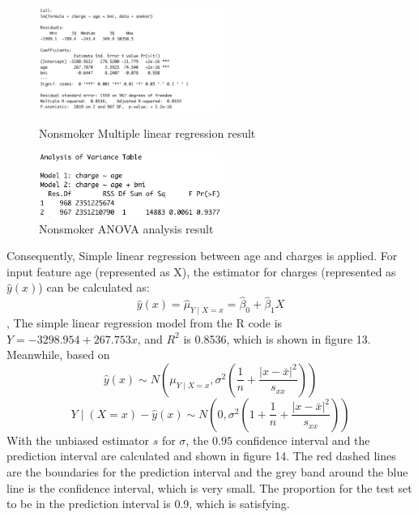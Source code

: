 \documentclass[12pt,a4paper]{article}
\begin{document}
\begin{figure}[H]
\centering
\begin{minipage}[t]{0.48\textwidth}
\centering
\includegraphics[width=6cm]{aftercleanlinear model.png}
\caption{Nonsmoker Multiple linear regression result}
\end{minipage}
\begin{minipage}[t]{0.48\textwidth}
\centering
\includegraphics[width=6cm]{ANOVA.jpg}
\caption{Nonsmoker ANOVA analysis result}
\end{minipage}
\end{figure}

Consequently, Simple linear regression between age and charges is applied.
For input feature age (represented as X), the estimator for charges (represented as $\widehat{y}(x)$) can be calculated as:
$$\widehat{y}(x)=\widehat{\mu}_{Y \mid X=x}=\widehat{\beta}_{0}+\widehat{\beta}_{1} X $$,
The simple linear regression model from the R code is $Y = -3298.954 + 267.753x$, and $R^{2}$ is 0.8536, which is shown in figure 13.
Meanwhile, based on
$$\widehat{y}(x) \sim N\left(\mu_{Y \mid X=x}, \sigma^{2}\left(\frac{1}{n}+\frac{|x-\bar{x}|^{2}}{s_{x x}}\right)\right)$$
$$Y \mid(X=x)-\widehat{y}(x) \sim N\left(0, \sigma^{2}\left(1+\frac{1}{n}+\frac{|x-\bar{x}|^{2}}{s_{x x}}\right)\right)$$
With the unbiased estimator $s$ for $\sigma$, the  $0.95 $ confidence interval and the prediction interval are calculated and shown in figure 14.
The red dashed lines are the boundaries for the prediction interval and the grey band around the blue line is the confidence interval, which is very small.
The proportion for the test set to be in the prediction interval is 0.9, which is satisfying.
\end{document}
